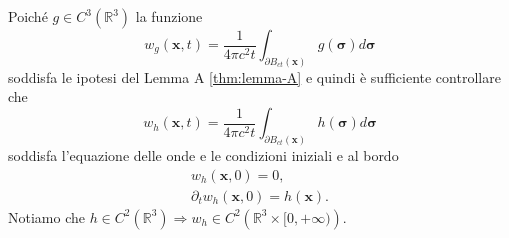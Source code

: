 \documentclass[10pt,a4paper,twoside,openright]{book}
\begin{document}
\begin{dimostrazione}
	Poiché $\displaystyle g\in C^{3}\left(\mathbb{R}^{3}\right)$ la funzione
	\begin{equation*}
		w_{g}(\mathbf{x} ,t) =\frac{1}{4\pi c^{2} t}\int _{\partial B_{ct}(\mathbf{x})} g(\bm{\sigma }) d\bm{\sigma }
	\end{equation*}
	soddisfa le ipotesi del Lemma A \ref{thm:lemma-A} e quindi è sufficiente controllare che
	\begin{equation*}
		w_{h}(\mathbf{x} ,t) =\frac{1}{4\pi c^{2} t}\int _{\partial B_{ct}(\mathbf{x})} h(\bm{\sigma }) d\bm{\sigma }
	\end{equation*}
	soddisfa l'equazione delle onde e le condizioni iniziali e al bordo
	\begin{gather*}
		w_{h}(\mathbf{x} ,0) =0,\\
		\partial _{t} w_{h}(\mathbf{x} ,0) =h(\mathbf{x}) .
	\end{gather*}
	Notiamo che $\displaystyle h\in C^{2}\left(\mathbb{R}^{3}\right) \Rightarrow w_{h} \in C^{2}\left(\mathbb{R}^{3} \times [ 0,+\infty )\right)$.


\end{dimostrazione}
\end{document}
